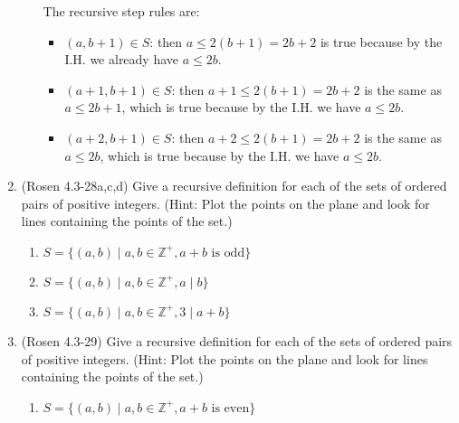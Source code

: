 \begin{enumerate}
\begin{enumerate}
{The recursive step rules are:
\begin{itemize}
\item $(a, b+1) \in S$: then $a \leq 2(b+1) = 2b + 2$ is true
because by the I.H. we already have $a\leq 2b$.
\item $(a+1,b+1) \in S$: then  $a + 1 \leq 2(b+1) = 2b + 2$ is the same
as $a \leq 2b + 1$, which is true because by the I.H. we have $a\leq 2b$.
\item $(a+2,b+1) \in S$: then  $a + 2 \leq 2(b+1) = 2b + 2$ is the same
as $a \leq 2b$, which is true because by the I.H. we have $a\leq 2b$.
\end{itemize}

}
\end{enumerate}

\item (Rosen 4.3-28a,c,d) Give a recursive definition for each of the 
sets of ordered pairs of positive integers. 
(Hint: Plot the points on the plane and look for lines containing 
the points of the set.)

\begin{enumerate}
\item \streasy $S=\{(a,b)  \mid  a,b\in \mathbb{Z}^+, a+b \text{~is odd}\}$

\item \strmedium $S=\{(a,b)  \mid  a,b\in \mathbb{Z}^+, a  \mid  b\}$

\item \strmedium $S=\{(a,b)  \mid  a,b\in \mathbb{Z}^+, 3  \mid  a+b\}$
\end{enumerate}

\item (Rosen 4.3-29) Give a recursive definition for each of the 
sets of ordered pairs of positive integers. 
(Hint: Plot the points on the plane and look for lines containing 
the points of the set.)

\begin{enumerate}
\item \strmedium $S=\{(a,b)  \mid  a,b\in \mathbb{Z}^+, a+b \text{~is even}\}$


\end{enumerate}
\end{enumerate}
